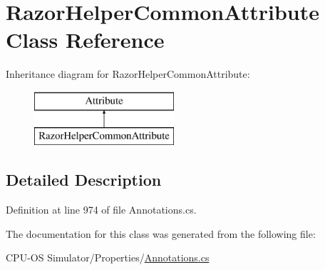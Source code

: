 \hypertarget{class_razor_helper_common_attribute}{}\section{Razor\+Helper\+Common\+Attribute Class Reference}
\label{class_razor_helper_common_attribute}
Inheritance diagram for Razor\+Helper\+Common\+Attribute\+:\begin{figure}[H]
\begin{center}
\leavevmode
\includegraphics[height=2.000000cm]{class_razor_helper_common_attribute}
\end{center}
\end{figure}


\subsection{Detailed Description}


Definition at line 974 of file Annotations.\+cs.



The documentation for this class was generated from the following file\+:\begin{DoxyCompactItemize}
\item 
C\+P\+U-\/\+O\+S Simulator/\+Properties/\hyperlink{_annotations_8cs}{Annotations.\+cs}\end{DoxyCompactItemize}
